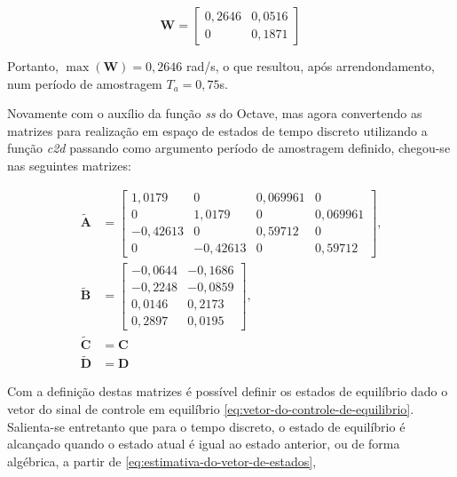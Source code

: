 \begin{equation}
    \label{eq:matriz-das-frequencias-de-corte}
    \mathbf{W} =
    \begin{bmatrix}
        0,2646 & 0,0516 \\
        0      & 0,1871
    \end{bmatrix}
\end{equation}

Portanto, $\max(\mathbf{W}) = 0,2646$ rad/s, o que resultou, após
arrendondamento, num período de amostragem $T_a = 0,75$s.

Novamente com o auxílio da função \textit{ss} do Octave, mas agora convertendo
as matrizes para realização em espaço de estados de tempo discreto utilizando a
função \textit{c2d} passando como argumento período de amostragem definido,
chegou-se nas seguintes matrizes:

\begin{subequations}
    \label{eq:matrizes-do-espaco-de-estados-discretizadas}
    \begin{align}
        \mathbf{\tilde{A}} & =
        \begin{bmatrix}
            \label{eq:matriz-til-a}
            1,0179 & 0       & 0,069961 & 0      \\
            0       & 1,0179 & 0      & 0,069961 \\
            -0,42613 & 0       & 0,59712 & 0      \\
            0       & -0,42613  & 0     & 0,59712
        \end{bmatrix}\text{,} \\
        \mathbf{\tilde{B}} & =
        \begin{bmatrix}
            \label{eq:matriz-til-b}
            -0,0644 & -0,1686  \\
            -0,2248 & -0,0859  \\
            0,0146  & 0,2173   \\
            0,2897  & 0,0195
        \end{bmatrix}\text{,} \\
        \mathbf{\tilde{C}} &= \mathbf{C} \\
        \mathbf{\tilde{D}} &= \mathbf{D}
    \end{align}
\end{subequations}

Com a definição destas matrizes é possível definir os estados de equilíbrio dado
o vetor do sinal de controle em equilíbrio
\ref{eq:vetor-do-controle-de-equilibrio}. Salienta-se entretanto que para o
tempo discreto, o estado de equilíbrio é alcançado quando o estado atual é igual
ao estado anterior, ou de forma algébrica, a partir de
\ref{eq:estimativa-do-vetor-de-estados},

